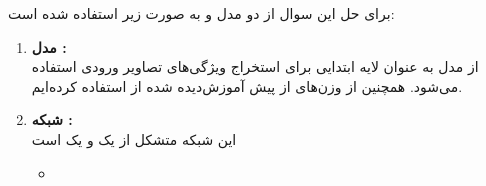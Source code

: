 \begin{qsolve}
برای حل این سوال از دو مدل  و  به صورت زیر استفاده شده است:

	\begin{enumerate}
		\item \textbf{مدل :}\\
از مدل  به عنوان لایه ابتدایی برای استخراج ویژگی‌های تصاویر ورودی استفاده می‌شود. همچنین از وزن‌های از پیش آموزش‌دیده شده از  استفاده کرده‌ایم.


		\item \textbf{شبکه :}\\
		این شبکه متشکل از یک  و یک  است
		\begin{itemize}
			\item 
		\end{itemize}
	\end{enumerate}
	
	
	
\end{qsolve}